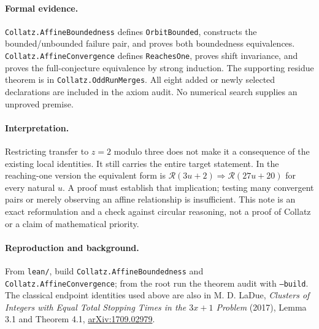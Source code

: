 \documentclass[10pt]{article}
\newcommand{\R}{\mathcal R}
\begin{document}
\paragraph{Formal evidence.}
\texttt{Collatz.AffineBoundedness} defines \texttt{OrbitBounded}, constructs
the bounded/unbounded failure pair, and proves both boundedness equivalences.
\texttt{Collatz.AffineConvergence} defines \texttt{ReachesOne}, proves shift
invariance, and proves the full-conjecture equivalence by strong induction.
The supporting residue theorem is in \texttt{Collatz.OddRunMerges}.
All eight added or newly selected declarations are included in the axiom
audit. No numerical search supplies an unproved premise.

\paragraph{Interpretation.}
Restricting transfer to $z=2$ modulo three does not make it a consequence
of the existing local identities. It still carries the entire target
statement. In the reaching-one version the equivalent form is
$\R(3u+2)\Rightarrow\R(27u+20)$ for every natural $u$.
A proof must establish that implication; testing many convergent pairs
or merely observing an affine relationship is insufficient. This note
is an exact reformulation and a check against circular reasoning, not
a proof of Collatz or a claim of mathematical priority.

\paragraph{Reproduction and background.}
\begingroup\raggedright
From \texttt{lean/}, build \texttt{Collatz.AffineBoundedness} and
\texttt{Collatz.AffineConvergence}; from the root run the theorem audit
with \texttt{--build}. The classical endpoint identities used above are
also in M. D. LaDue, \emph{Clusters of Integers with Equal Total Stopping
Times in the $3x+1$ Problem} (2017), Lemma 3.1 and Theorem 4.1,
\href{https://arxiv.org/abs/1709.02979}{arXiv:1709.02979}.\par\endgroup
\end{document}

